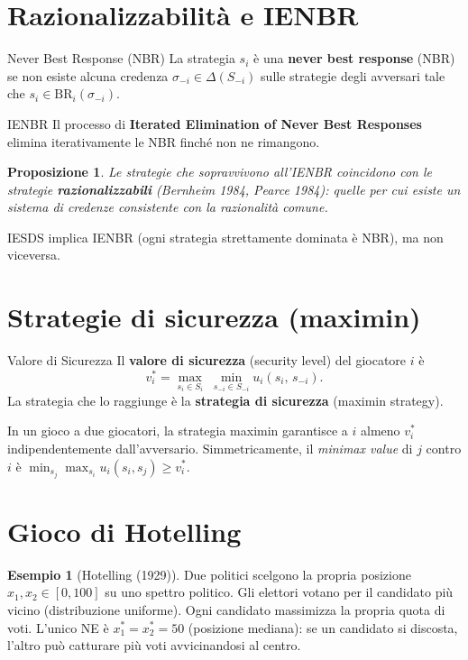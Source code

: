\documentclass[12pt,a4paper,twoside]{book}
\theoremstyle{plain}
\newtheorem{proposition}[theorem]{Proposizione}
\theoremstyle{definition}
\newtheorem{example}[theorem]{Esempio}
\newcommand{\BR}{\mathrm{BR}}
\begin{document}
\section{Razionalizzabilità e IENBR}

\begin{defbox}{Never Best Response (NBR)}
La strategia $s_i$ è una \textbf{never best response} (NBR) se non esiste alcuna credenza $\sigma_{-i}\in\Delta(S_{-i})$ sulle strategie degli avversari tale che $s_i\in\BR_i(\sigma_{-i})$.
\end{defbox}

\begin{defbox}{IENBR}
Il processo di \textbf{Iterated Elimination of Never Best Responses} elimina iterativamente le NBR finché non ne rimangono.
\end{defbox}

\begin{proposition}
Le strategie che sopravvivono all'IENBR coincidono con le strategie \textbf{razionalizzabili} (Bernheim 1984, Pearce 1984): quelle per cui esiste un sistema di credenze consistente con la razionalità comune.
\end{proposition}

IESDS implica IENBR (ogni strategia strettamente dominata è NBR), ma non viceversa.

\section{Strategie di sicurezza (maximin)}

\begin{defbox}{Valore di Sicurezza}
Il \textbf{valore di sicurezza} (security level) del giocatore $i$ è
\[
  v_i^* = \max_{s_i\in S_i}\; \min_{s_{-i}\in S_{-i}} u_i(s_i,\, s_{-i}).
\]
La strategia che lo raggiunge è la \textbf{strategia di sicurezza} (maximin strategy).
\end{defbox}

In un gioco a due giocatori, la strategia maximin garantisce a $i$ almeno $v_i^*$ indipendentemente dall'avversario. Simmetricamente, il \emph{minimax value} di $j$ contro $i$ è $\min_{s_j}\max_{s_i} u_i(s_i,s_j) \ge v_i^*$.

\section{Gioco di Hotelling}

\begin{example}[Hotelling (1929)]
Due politici scelgono la propria posizione $x_1,x_2\in[0,100]$ su uno spettro politico. Gli elettori votano per il candidato più vicino (distribuzione uniforme). Ogni candidato massimizza la propria quota di voti. L'unico NE è $x_1^*=x_2^*=50$ (posizione mediana): se un candidato si discosta, l'altro può catturare più voti avvicinandosi al centro.
\end{example}
\end{document}

